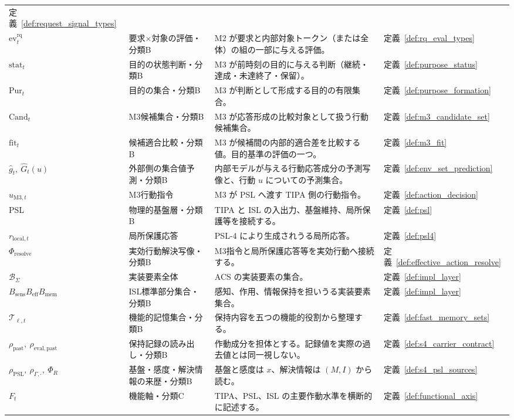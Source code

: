 \begin{longtable}{p{3.0cm} p{3.0cm} p{6.6cm} p{2.0cm}}
定義~\ref{def:request_signal_types} \\[3pt]
$\mathrm{ev}^{\mathrm{rq}}_t$ & 要求×対象の評価・分類B &
M2 が要求と内部対象トークン（または全体）の組の一部に与える評価。 &
定義~\ref{def:rq_eval_types} \\[3pt]
$\mathrm{stat}_t$ & 目的の状態判断・分類B &
M3 が前時刻の目的に与える判断（継続・達成・未達終了・保留）。 &
定義~\ref{def:purpose_status} \\[3pt]
$\mathrm{Pur}_t$ & 目的の集合・分類B &
M3 が判断として形成する目的の有限集合。 &
定義~\ref{def:purpose_formation} \\[3pt]
$\mathrm{Cand}_t$ & M3候補集合・分類B &
M3 が応答形成の比較対象として扱う行動候補集合。 &
定義~\ref{def:m3_candidate_set} \\[3pt]
$\mathrm{fit}_t$ & 候補適合比較・分類B &
M3 が候補間の内部的適合差を比較する値。目的基準の評価の一つ。 &
定義~\ref{def:m3_fit} \\[3pt]
$\hat g_t,\ \hat G_t(u)$ & 外部側の集合値予測・分類B &
内部モデルが与える行動応答成分の予測写像と、行動 $u$ についての予測集合。 &
定義~\ref{def:env_set_prediction} \\[3pt]
$u_{\mathrm{M3},t}$ & M3行動指令 &
M3 が PSL へ渡す TIPA 側の行動指令。 &
定義~\ref{def:action_decision} \\[3pt]
PSL & 物理的基盤層・分類B &
TIPA と ISL の入出力、基盤維持、局所保護等を接続する。 &
定義~\ref{def:psl} \\[3pt]
$r_{\mathrm{local},t}$ & 局所保護応答 &
PSL-4 により生成されうる局所応答。 &
定義~\ref{def:psl4} \\[3pt]
$\Phi_{\mathrm{resolve}}$ & 実効行動解決写像・分類B &
M3指令と局所保護応答等を実効行動へ接続する。 &
定義~\ref{def:effective_action_resolve} \\[3pt]
$\mathcal B_\Sigma$ & 実装要素全体 &
ACS の実装要素の集合。 &
定義~\ref{def:impl_layer} \\[3pt]
$B_{\mathrm{sens}}$\newline $B_{\mathrm{eff}}$\newline $B_{\mathrm{mem}}$ & ISL標準部分集合・分類B &
感知、作用、情報保持を担いうる実装要素集合。 &
定義~\ref{def:impl_layer} \\[3pt]
$\mathcal T_{\ell,t}$ & 機能的記憶集合・分類B &
保持内容を五つの機能的役割から整理する。 &
定義~\ref{def:fast_memory_sets} \\[3pt]
$\rho_{\mathrm{past}},\ \rho_{\mathrm{eval,past}}$ & 保持記録の読み出し・分類B &
作動成分を担体とする。記録値を実際の過去値とは同一視しない。 &
定義~\ref{def:s4_carrier_contract} \\[3pt]
$\rho_{\mathrm{PSL}},\ \rho_{\Gamma,\cdot},\ \Phi_R$ & 基盤・感度・解決情報の来歴・分類B &
基盤と感度は $x$、解決情報は $(M,I)$ から読む。 &
定義~\ref{def:s4_psl_sources} \\[3pt]
$F_t$ & 機能軸・分類C &
TIPA、PSL、ISL の主要作動水準を横断的に記述する。 &
定義~\ref{def:functional_axis} \\[3pt]
\end{longtable}
\endgroup

